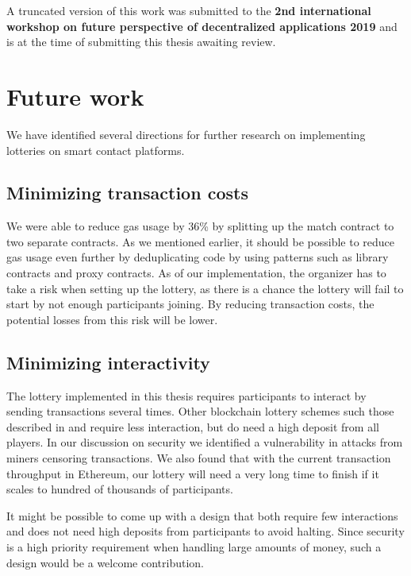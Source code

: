 A truncated version of this work was submitted to the \textbf{2nd international workshop on future perspective of decentralized applications 2019} and is at the time of submitting this thesis awaiting review.

\section{Future work}
\label{sec:future-work}

We have identified several directions for further research on implementing lotteries on smart contact platforms.

\subsection{Minimizing transaction costs}

We were able to reduce gas usage by 36\% by splitting up the match contract to two separate contracts. As we mentioned earlier, it should be possible to reduce gas usage even further by deduplicating code by using patterns such as library contracts and proxy contracts. As of our implementation, the organizer has to take a risk when setting up the lottery, as there is a chance the lottery will fail to start by not enough participants joining. By reducing transaction costs, the potential losses from this risk will be lower.

\subsection{Minimizing interactivity}

The lottery implemented in this thesis requires participants to interact by sending transactions several times. Other blockchain lottery schemes such those described in \cite{andrychowicz_secure_2014} and \cite{bentov_how_2014} require less interaction, but do need a high deposit from all players. In our discussion on security we identified a vulnerability in attacks from miners censoring transactions. We also found that with the current transaction throughput in Ethereum, our lottery will need a very long time to finish if it scales to hundred of thousands of participants. 

It might be possible to come up with a design that both require few interactions and does not need high deposits from participants to avoid halting. Since security is a high priority requirement when handling large amounts of money, such a design would be a welcome contribution.

